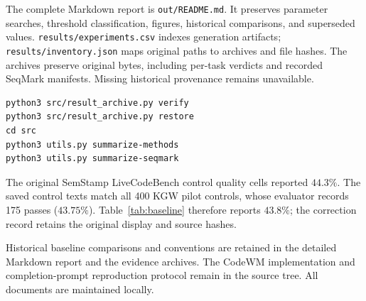 \documentclass[11pt]{article}
\begin{document}
The complete Markdown report is \texttt{out/README.md}. It preserves parameter
searches, threshold classification, figures, historical comparisons, and
superseded values. \texttt{results/experiments.csv} indexes generation artifacts;
\texttt{results/inventory.json} maps original paths to archives and file hashes.
The archives preserve original bytes, including per-task verdicts and recorded
SeqMark manifests. Missing historical provenance remains unavailable.

\begin{verbatim}
python3 src/result_archive.py verify
python3 src/result_archive.py restore
cd src
python3 utils.py summarize-methods
python3 utils.py summarize-seqmark
\end{verbatim}

The original SemStamp LiveCodeBench control quality cells reported $44.3\%$.
The saved control texts match all 400 KGW pilot controls, whose evaluator
records 175 passes ($43.75\%$). Table~\ref{tab:baseline} therefore reports
$43.8\%$; the correction record retains the original display and source hashes.

Historical baseline comparisons and conventions are retained in the detailed
Markdown report and the evidence archives. The CodeWM implementation and
completion-prompt reproduction protocol remain in the source tree.
All documents are maintained locally.
\end{document}
